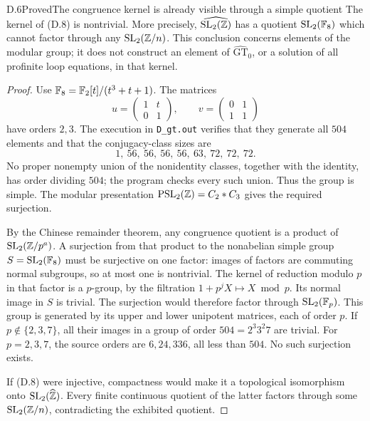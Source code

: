 \begin{statement}{D.6}{Proved}{The congruence kernel is already visible through a simple quotient}
The kernel of (D.8) is nontrivial.  More precisely,
\(\widehat{\operatorname{SL}_2(\mathbb Z)}\) has a quotient \(\operatorname{SL}_2(\mathbb F_8)\) which
cannot factor through any \(\operatorname{SL}_2(\mathbb Z/n)\).
This conclusion concerns elements of the modular group; it does
not construct an element of \(\widehat{\mathrm{GT}}_0\), or a
solution of all profinite loop equations, in that kernel.
\end{statement}
\begin{proof}
Use \(\mathbb F_8=\mathbb F_2[t]/(t^3+t+1)\).  The matrices
\[
 u=\begin{pmatrix}1&t\\0&1\end{pmatrix},\qquad
 v=\begin{pmatrix}0&1\\1&1\end{pmatrix}
\]
have orders \(2,3\).
The execution in \texttt{D\_gt.out} verifies that they generate
all \(504\) elements and that the conjugacy-class sizes are
\[
 1,\ 56,\ 56,\ 56,\ 56,\ 63,\ 72,\ 72,\ 72 .
\]
No proper nonempty union of the nonidentity classes, together
with the identity, has order dividing \(504\); the program checks
every such union.  Thus the group is simple.
The modular presentation
\(\operatorname{PSL}_2(\mathbb Z)=C_2*C_3\) gives the required surjection.

By the Chinese remainder theorem, any congruence quotient is a
product of \(\operatorname{SL}_2(\mathbb Z/p^a)\).  A surjection from that product
to the nonabelian simple group \(S=\operatorname{SL}_2(\mathbb F_8)\) must be
surjective on one factor: images of factors are commuting normal
subgroups, so at most one is nontrivial.  The kernel of reduction
modulo \(p\) in that factor is a \(p\)-group, by the filtration
\(1+p^jX\mapsto X\bmod p\).  Its normal image in \(S\) is
trivial.  The surjection would therefore factor through
\(\operatorname{SL}_2(\mathbb F_p)\).  This group is generated by its upper and lower
unipotent matrices, each of order \(p\).  If
\(p\notin\{2,3,7\}\), all their images in a group of order
\(504=2^3 3^2 7\) are trivial.  For \(p=2,3,7\), the source
orders are \(6,24,336\), all less than \(504\).  No such
surjection exists.

If (D.8) were injective, compactness would make it a topological
isomorphism onto \(\operatorname{SL}_2(\widehat{\mathbb Z})\).
Every finite continuous quotient of the latter factors through
some \(\operatorname{SL}_2(\mathbb Z/n)\), contradicting the exhibited quotient.
\end{proof}

